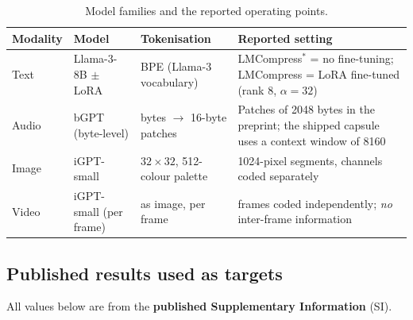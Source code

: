 \documentclass[11pt,a4paper]{article}
\begin{document}
\begin{table}[htbp]
\centering
\small
\caption{Model families and the reported operating points.}
\label{tab:models}
\begin{tabularx}{\textwidth}{L{2.6cm}L{3.4cm}L{3.4cm}X}
\toprule
Modality & Model & Tokenisation & Reported setting \\
\midrule
Text & Llama-3-8B $\pm$ LoRA & BPE (Llama-3 vocabulary) &
  LMCompress$^{*}$ = no fine-tuning; LMCompress = LoRA fine-tuned (rank 8,
  $\alpha=32$) \\
Audio & bGPT (byte-level) & bytes $\to$ 16-byte patches &
  Patches of \num{2048} bytes in the preprint; the shipped capsule uses a
  context window of \num{8160} \\
Image & iGPT-small & $32\times32$, 512-colour palette &
  1024-pixel segments, channels coded separately \\
Video & iGPT-small (per frame) & as image, per frame &
  frames coded independently; \emph{no} inter-frame information \\
\bottomrule
\end{tabularx}
\end{table}

\subsection{Published results used as targets}

All values below are from the \textbf{published Supplementary Information} (SI).
\end{document}
